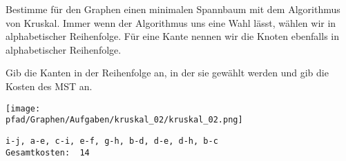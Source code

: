 ﻿\question[3]
Bestimme für den Graphen einen minimalen Spannbaum mit dem Algorithmus von Kruskal. Immer wenn der Algorithmus uns eine
Wahl lässt, wählen wir in alphabetischer Reihenfolge. Für eine Kante nennen wir die Knoten ebenfalls
in alphabetischer Reihenfolge.

Gib die Kanten in der Reihenfolge an, in der sie gewählt werden und gib die Kosten des MST an.

\texttt{[image: \\pfad/Graphen/Aufgaben/kruskal\_02/kruskal\_02.png]}
\begin{solutionbox}{4cm}
\begin{lstlisting}
i-j, a-e, c-i, e-f, g-h, b-d, d-e, d-h, b-c
Gesamtkosten:  14
\end{lstlisting}

\end{solutionbox}
